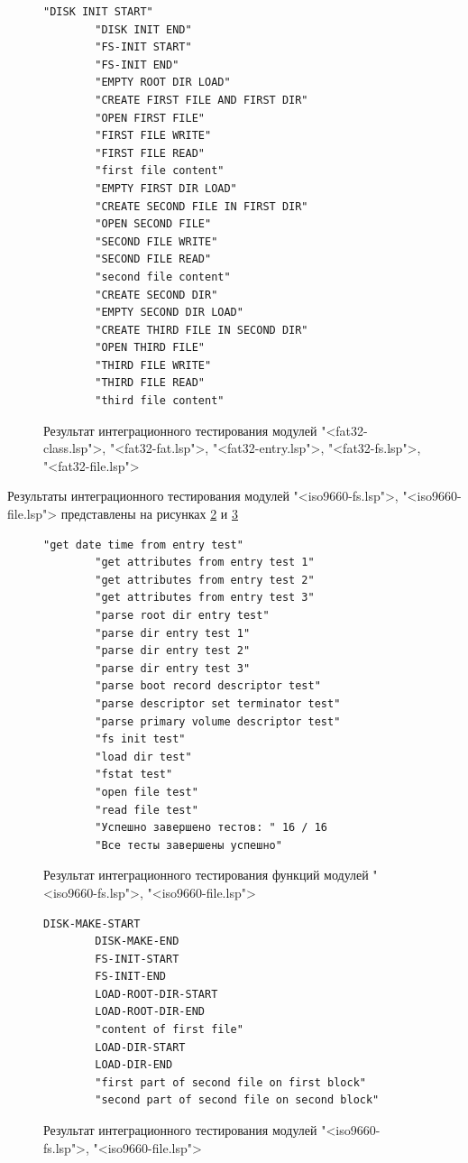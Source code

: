 \begin{figure}[H]
	\begin{lstlisting}[language={}]
		"DISK INIT START"
		"DISK INIT END"
		"FS-INIT START"
		"FS-INIT END"
		"EMPTY ROOT DIR LOAD"
		"CREATE FIRST FILE AND FIRST DIR"
		"OPEN FIRST FILE"
		"FIRST FILE WRITE"
		"FIRST FILE READ"
		"first file content"
		"EMPTY FIRST DIR LOAD"
		"CREATE SECOND FILE IN FIRST DIR"
		"OPEN SECOND FILE"
		"SECOND FILE WRITE"
		"SECOND FILE READ"
		"second file content"
		"CREATE SECOND DIR"
		"EMPTY SECOND DIR LOAD"
		"CREATE THIRD FILE IN SECOND DIR"
		"OPEN THIRD FILE"
		"THIRD FILE WRITE"
		"THIRD FILE READ"
		"third file content"
	\end{lstlisting}  
	\caption{Результат интеграционного тестирования модулей "<fat32-class.lsp">, "<fat32-fat.lsp">, "<fat32-entry.lsp">, "<fat32-fs.lsp">, "<fat32-file.lsp">}
	\label{unitFATdisk:image}
\end{figure}

Результаты интеграционного тестирования модулей "<iso9660-fs.lsp">, "<iso9660-file.lsp"> представлены на рисунках \ref{unitISO:image} и \ref{unitISOdisk:image}

\begin{figure}[H]
	\begin{lstlisting}[language={}]
		"get date time from entry test"
		"get attributes from entry test 1"
		"get attributes from entry test 2"
		"get attributes from entry test 3"
		"parse root dir entry test"
		"parse dir entry test 1"
		"parse dir entry test 2"
		"parse dir entry test 3"
		"parse boot record descriptor test"
		"parse descriptor set terminator test"
		"parse primary volume descriptor test"
		"fs init test"
		"load dir test"
		"fstat test"
		"open file test"
		"read file test"
		"Успешно завершено тестов: " 16 / 16
		"Все тесты завершены успешно"
	\end{lstlisting}  
	\caption{Результат интеграционного тестирования функций модулей "<iso9660-fs.lsp">, "<iso9660-file.lsp">}
	\label{unitISO:image}
\end{figure}

\begin{figure}[H]
	\begin{lstlisting}[language={}]
		DISK-MAKE-START
		DISK-MAKE-END
		FS-INIT-START
		FS-INIT-END
		LOAD-ROOT-DIR-START
		LOAD-ROOT-DIR-END
		"content of first file"
		LOAD-DIR-START
		LOAD-DIR-END
		"first part of second file on first block"
		"second part of second file on second block"
	\end{lstlisting}  
	\caption{Результат интеграционного тестирования модулей "<iso9660-fs.lsp">, "<iso9660-file.lsp">}
	\label{unitISOdisk:image}
\end{figure}


